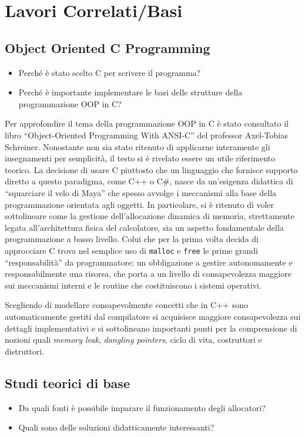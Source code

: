 \chapter{Lavori Correlati/Basi}
\section{Object Oriented C Programming}
\begin{itemize}
  \item Perché è stato scelto C per scrivere il programma?
  \item Perché è importante implementare le basi delle strutture della programmazione OOP in C?
\end{itemize}

Per approfondire il tema della programmazione OOP in C è stato consultato il libro ``Object-Oriented Programming With ANSI-C'' del professor Axel-Tobias Schreiner. Nonostante non sia stato ritenuto di applicarne interamente gli insegnamenti per semplicità, il testo si è rivelato essere un utile riferimento teorico. La decisione di usare C piuttosto che un linguaggio che fornisce supporto diretto a questo paradigma, come C++ o C\#, nasce da un’esigenza didattica di ``squarciare il velo di Maya'' che spesso avvolge i meccanismi alla base della programmazione orientata agli oggetti. In particolare, si è ritenuto di voler sottolineare come la gestione dell’allocazione dinamica di memoria, strettamente legata all’architettura fisica del calcolatore, sia un aspetto fondamentale della programmazione a basso livello. Colui che per la prima volta decida di approcciare C trova nel semplice uso di \texttt{malloc} e \texttt{free} le prime grandi ``responsabilità'' da programmatore: un obbligazione a gestire autonomamente e responsabilmente una risorsa, che porta a un livello di consapevolezza maggiore sui meccanismi interni e le routine che costituiscono i sistemi operativi.

Scegliendo di modellare consapevolmente concetti che in C++ sono automaticamente gestiti dal compilatore si acquisisce maggiore consapevolezza sui dettagli implementativi e si sottolineano importanti punti per la comprensione di nozioni quali \textit{memory leak}, \textit{dangling pointers}, ciclo di vita, costruttori e distruttori.

\section{Studi teorici di base}
\begin{itemize}
  \item Da quali fonti è possibile imparare il funzionamento degli allocatori?
  \item Quali sono delle soluzioni didatticamente interessanti?
\end{itemize}

